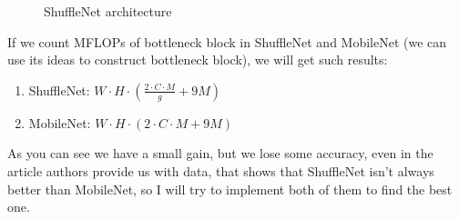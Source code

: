 \begin{figure}[ht]
    \begin{center}
    \end{center}
    \caption{ShuffleNet architecture}\label{ShuffleNet architecture}
\end{figure}

If we count MFLOPs of bottleneck block in ShuffleNet and MobileNet 
(we can use its ideas to construct bottleneck block), we will get such results:
\begin{enumerate}
    \item ShuffleNet: $W\cdot H \cdot (\frac{2\cdot C \cdot M}{g} + 9M)$
    \item MobileNet: $W\cdot H \cdot (2 \cdot C \cdot M + 9M)$
\end{enumerate}
As you can see we have a small gain, but we lose some accuracy, even in the article authors
provide us with data, that shows that ShuffleNet isn't always better than MobileNet,
so I will try to implement both of them to find the best one.

